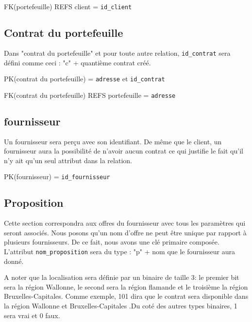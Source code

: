 \begin{flushleft}
FK(portefeuille) REFS client = \texttt{id\_client}
\end{flushleft}
\subsection{Contrat du portefeuille}
\begin{flushleft}
 Dans "contrat du portefeuille" et pour toute autre relation, \texttt{id\_contrat} sera défini comme ceci : "c" + quantième contrat créé.
\end{flushleft}

\begin{flushleft}
PK(contrat du portefeuille) = \texttt{adresse} et \texttt{id\_contrat}
\end{flushleft}

\begin{flushleft}
FK(contrat du portefeuille) REFS portefeuille = \texttt{adresse}
\end{flushleft}
\subsection{fournisseur}
\begin{flushleft}
Un fournisseur sera perçu avec son identifiant. De même que le client, un fournisseur aura la possibilité de n'avoir aucun contrat ce qui justifie le fait qu'il n'y ait qu'un seul attribut dans la relation.
\end{flushleft}

\begin{flushleft}
PK(fournisseur) = \texttt{id\_fournisseur}
\end{flushleft}
\subsection{Proposition}
\begin{flushleft}
Cette section correspondra aux offres du fournisseur avec tous les paramètres qui seront associés. Nous posons qu'un nom d'offre ne peut être unique par rapport à plusieurs fournisseurs. De ce fait, nous avons une clé primaire composée. L'attribut \texttt{nom\_proposition} sera du type : "p" + nom que le fournisseur aura donné.
\end{flushleft}

\begin{flushleft}
A noter que la localisation sera définie par un binaire de taille 3: le premier bit sera la région Wallonne, le second sera la région flamande et le troisième la région Bruxelles-Capitales. Comme exemple, 101 dira que le contrat sera disponible dans la région Wallonne et Bruxelles-Capitales .Du coté des autres types binaires, 1 sera vrai et 0 faux. 
\end{flushleft}

